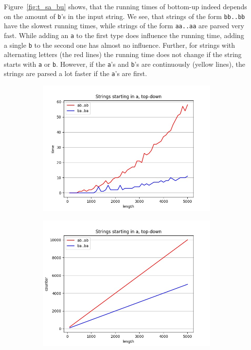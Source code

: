 Figure~\ref{fig:t_sa_bu} shows, that the running times of bottom-up indeed depends on the amount of \texttt{b}'s in the input string.
We see, that strings of the form \texttt{bb..bb} have the slowest running times, while strings of the form \texttt{aa..aa} are parsed very fast.
While adding an \texttt{a} to the first type does influence the running time, adding a single \texttt{b} to the second one has almost no influence.
Further, for strings with alternating letters (the red lines) the running time does not change if the string starts with \texttt{a} or \texttt{b}.
However, if the \texttt{a}'s and \texttt{b}'s are continuously (yellow lines), the strings are parsed a lot faster if the \texttt{a}'s are first.

\begin{figure}[!ht]
    \centering
    \begin{subfigure}[b]{0.48\textwidth}
        \includegraphics[width=1.1\textwidth]{Resources/t_sa_td.jpg}
        \caption{}
        \label{fig:t_sa_td}
    \end{subfigure}
    \hfill
    \begin{subfigure}[b]{0.48\textwidth}
        \centering
        \includegraphics[width=1.1\textwidth]{Resources/c_sa_td.jpg}

\end{subfigure}
\end{figure}

